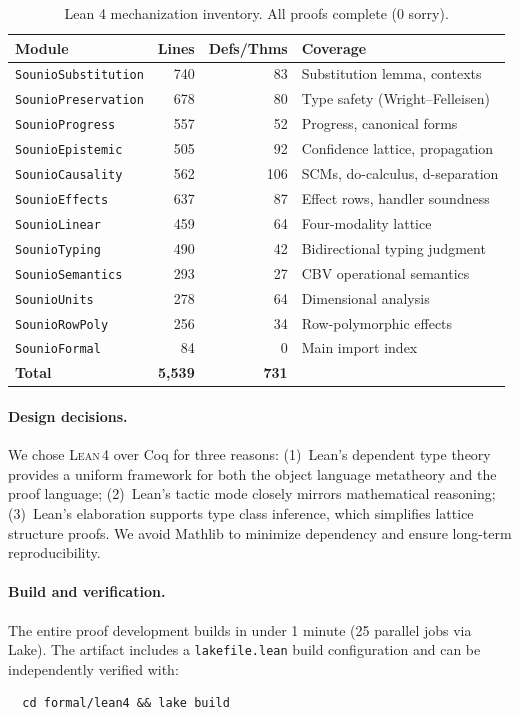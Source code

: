 \documentclass[acmsmall,screen,review,anonymous]{acmart}
\newcommand{\lean}{\textsc{Lean\,4}\xspace}
\begin{document}
\begin{table}[t]
\centering
\caption{Lean 4 mechanization inventory. All proofs complete (0 sorry).}
\label{tab:lean-inventory}
\begin{tabular}{lrrl}
\toprule
Module & Lines & Defs/Thms & Coverage \\
\midrule
\texttt{SounioSubstitution} & 740 & 83 & Substitution lemma, contexts \\
\texttt{SounioPreservation} & 678 & 80 & Type safety (Wright--Felleisen) \\
\texttt{SounioProgress}     & 557 & 52 & Progress, canonical forms \\
\texttt{SounioEpistemic}    & 505 & 92 & Confidence lattice, propagation \\
\texttt{SounioCausality}    & 562 & 106 & SCMs, do-calculus, d-separation \\
\texttt{SounioEffects}      & 637 & 87 & Effect rows, handler soundness \\
\texttt{SounioLinear}       & 459 & 64 & Four-modality lattice \\
\texttt{SounioTyping}       & 490 & 42 & Bidirectional typing judgment \\
\texttt{SounioSemantics}    & 293 & 27 & CBV operational semantics \\
\texttt{SounioUnits}        & 278 & 64 & Dimensional analysis \\
\texttt{SounioRowPoly}      & 256 & 34 & Row-polymorphic effects \\
\texttt{SounioFormal}       & 84  & 0  & Main import index \\
\midrule
\textbf{Total}              & \textbf{5{,}539} & \textbf{731} & \\
\bottomrule
\end{tabular}
\end{table}

\paragraph{Design decisions.}
We chose \lean over Coq for three reasons: (1)~Lean's dependent
type theory provides a uniform framework for both the object language
metatheory and the proof language; (2)~Lean's tactic mode closely
mirrors mathematical reasoning; (3)~Lean's elaboration supports
type class inference, which simplifies lattice structure proofs.
We avoid Mathlib to minimize dependency and ensure long-term
reproducibility.

\paragraph{Build and verification.}
The entire proof development builds in under 1 minute (25 parallel
jobs via Lake).
The artifact includes a \texttt{lakefile.lean} build configuration and
can be independently verified with:
\begin{verbatim}
  cd formal/lean4 && lake build
\end{verbatim}
\end{document}
